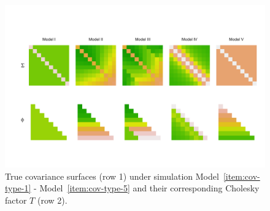\begin{figure}[H] \label{fig:true-covariance-heatmaps}
\centering
  \includegraphics[width = \textwidth]{../img/chapter-4/cov-cholesky-grid}
\caption{True covariance surfaces (row 1) under simulation Model~\ref{item:cov-type-1} - Model~\ref{item:cov-type-5} and their corresponding Cholesky factor $T$ (row 2).}
\end{figure}

